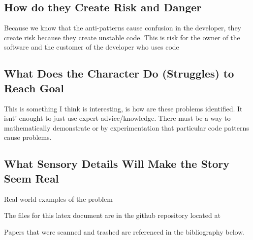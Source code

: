 \documentclass[conference]{IEEEtran}
\begin{document}
\subsection{How do they Create Risk and Danger}
Because we know that the anti-patterns cause confusion in the developer, they create risk because they create unstable code. 
This is risk for the owner of the software and the customer of the developer who uses code
\subsection{What Does the Character Do (Struggles) to Reach Goal}
This is something I think is interesting, is how are these problems identified.
It isnt' enought to just use expert advice/knowledge. 
There must be a way to mathematically demonstrate or by experimentation that particular code patterns cause problems.

\subsection{What Sensory Details Will Make the Story Seem Real}
Real world examples of the problem

The files for this latex document are in the github repository located at 

Papers that were scanned and trashed are referenced in the bibliography below. 
\nocite{*}
\clearpage




\end{document}
